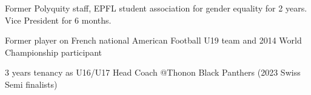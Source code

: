 


\begin{cventries}
	
	
	\cventry
	{} %
	{}
	{}
	{}
	{ %
		\begin{cvitems}
			\item {Former Polyquity staff, EPFL  student association for gender equality for 2 years. Vice President for 6 months.}
			\item {Former player on French national American Football U19 team and 2014 World Championship participant}
			\item {3 years tenancy as U16/U17 Head Coach @Thonon Black Panthers (2023 Swiss Semi finalists)}
		\end{cvitems}
	}
	
	
	
	
\end{cventries}